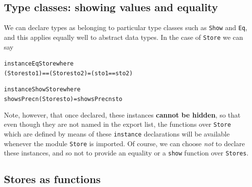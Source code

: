 

\subsection*{Type classes: showing values and equality}

We can declare types as belonging to particular type classes such as
\texttt{Show} and \texttt{Eq}, and this applies equally well to abstract data
types. In the case of \texttt{Store} we can say
\begin{alltt}
instance Eq Store where 
  (Store sto1) == (Store sto2) = (sto1 == sto2)					

instance Show Store where
  showsPrec n (Store sto) = showsPrec n sto		
\end{alltt}
Note, however, that once declared, these instances \textbf{cannot be
hidden}, so that even though they are not named in the export list, the
functions over \texttt{Store} which are defined by means of these
\texttt{instance} declarations will be available whenever the module
\texttt{Store} is imported. Of course, we can choose {\em not\/} to
declare these instances, and so not to provide an equality or a
\texttt{show} function over \texttt{Stores}.

\subsection*{Stores as functions}

